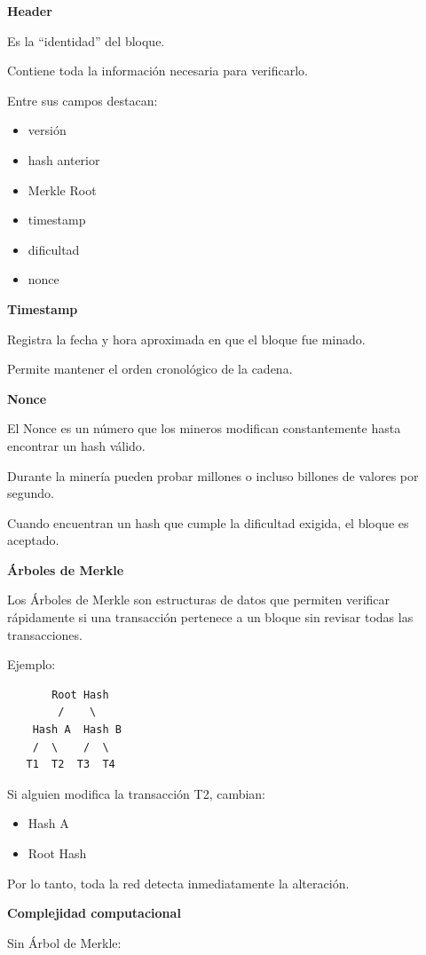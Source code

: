 \documentclass[12pt,a4paper]{article}
\begin{document}
\textbf{Header}

Es la ``identidad'' del bloque.

Contiene toda la información necesaria para verificarlo.

Entre sus campos destacan:

\begin{itemize}
  \item versión
  \item hash anterior
  \item Merkle Root
  \item timestamp
  \item dificultad
  \item nonce
\end{itemize}

\textbf{Timestamp}

Registra la fecha y hora aproximada en que el bloque fue minado.

Permite mantener el orden cronológico de la cadena.

\textbf{Nonce}

El Nonce es un número que los mineros modifican constantemente hasta encontrar un hash válido.

Durante la minería pueden probar millones o incluso billones de valores por segundo.

Cuando encuentran un hash que cumple la dificultad exigida, el bloque es aceptado.

\textbf{Árboles de Merkle}

Los Árboles de Merkle son estructuras de datos que permiten verificar rápidamente si una transacción pertenece a un bloque sin revisar todas las transacciones.

Ejemplo:

\begin{verbatim}
       Root Hash
        /    \
    Hash A  Hash B
    /  \    /  \
   T1  T2  T3  T4
\end{verbatim}

Si alguien modifica la transacción T2, cambian:

\begin{itemize}
  \item Hash A
  \item Root Hash
\end{itemize}

Por lo tanto, toda la red detecta inmediatamente la alteración.

\textbf{Complejidad computacional}

Sin Árbol de Merkle:
\end{document}
